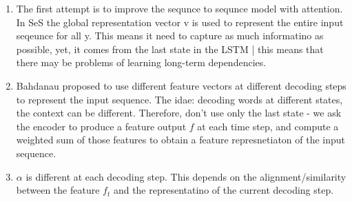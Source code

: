 \documentclass[11pt]{article}
\begin{document}
\begin{figure}[H]
    \centering
\end{figure}

\begin{enumerate}
    \item The first attempt is to improve the sequnce to sequnce model with attention. In SeS the global representation vector v is used to represent the entire input seqeunce for all y. This means it need to capture as much informatino as possible, yet, it comes from the last state in the LSTM | this means that there may be problems of learning long-term dependencies.
    \item Bahdanau proposed to use different feature vectors at different decoding steps to represent the input sequence. The idae: decoding words at different states, the context can be different. Therefore, don't use only the last state - we ask the encoder to produce a feature output $f$ at each time step, and compute a weighted sum of those features to obtain a feature represnetiaton of the input sequence.
    \item $\alpha$ is different at each decoding step. This depends on the alignment/similarity between the feature $f_t$ and the representatino of the current decoding step.
\end{enumerate}

\begin{figure}[H]
    \centering
\end{figure}
\end{document}
